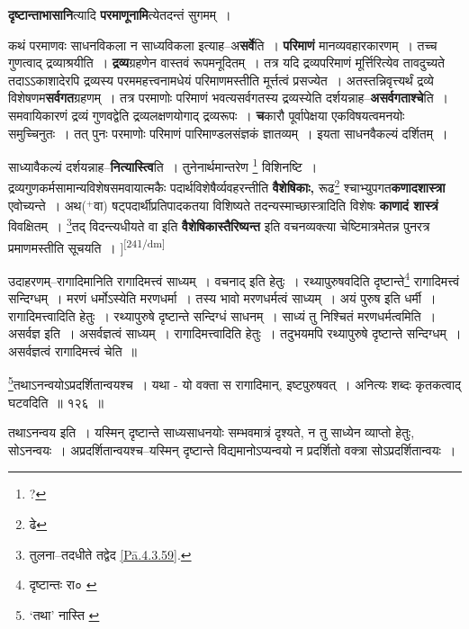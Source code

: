 \documentclass[article,12pt,a4paper]{memoir}
\newcommand{\add}[1]{($^{+}$#1)}
\begin{document}
	  \pstart \textbf{दृष्टान्ताभासानि}त्यादि \textbf{परमाणूनामि}त्येतदन्तं सुगमम् ।
	\pend
      

	  \pstart कथं परमाणवः साधनविकला न साध्यविकला इत्याह--अ\textbf{सर्वे}ति । \textbf{परिमाणं} मानव्यवहारकारणम् । तच्च गुणत्वाद् द्रव्याश्रयीति । \textbf{द्रव्य}ग्रहणेन वास्तवं रूपमनूदितम् । तत्र यदि द्रव्यपरिमाणं मूर्त्तिरित्येव तावदुच्यते तदाऽऽकाशादेरपि द्रव्यस्य परममहत्त्वनामधेयं परिमाणमस्तीति मूर्त्तत्वं प्रसज्येत । अतस्तन्निवृत्त्यर्थं द्रव्ये विशेषणम\textbf{सर्वगत}ग्रहणम् । तत्र परमाणोः परिमाणं भवत्यसर्वगतस्य द्रव्यस्येति दर्शयन्नाह--\textbf{असर्वगताश्चे}ति । समवायिकारणं द्रव्यं गुणवद्वेति द्रव्यलक्षणयोगाद् द्रव्यरूपः । \textbf{च}कारौ पूर्वापेक्षया एकविषयत्वमनयोः समुच्चिनुतः । तत् पुनः परमाणोः परिमाणं पारिमाण्डलसंज्ञकं ज्ञातव्यम् । इयता साधनवैकल्यं दर्शितम् ।
	\pend
      

	  \pstart साध्यावैकल्यं दर्शयन्नाह--\textbf{नित्यास्त्वि}ति । तुनेनार्थमान्तरेण \footnote{?} विशिनष्टि । द्रव्यगुणकर्मसामान्यविशेषसमवायात्मकैः पदार्थविशेषैर्व्यवहरन्तीति \textbf{वैशेषिकाः,} रूढ\footnote{ढे} श्चाभ्युपगत\textbf{कणादशास्त्रा} एवोच्यन्ते । अथ\add{वा} षट्पदार्थीप्रतिपादकतया विशिष्यते तदन्यस्माच्छास्त्रादिति विशेषः \textbf{काणादं शास्त्रं} विवक्षितम् । \footnote{तुलना--तदधीते तद्वेद \cref{Pā.4.3.59}.}तद् विदन्त्यधीयते वा इति \textbf{वैशेषिकास्तैरिष्यन्त} इति वचनव्यक्त्या चेष्टिमात्रमेतन्न पुनरत्र प्रमाणमस्तीति सूचयति ।
	\pend
      [[दिति साध्य० \cite{dp-msB} \cite{dp-edP} \cite{dp-edH} \cite{dp-edE} \cite{dp-edN}]]\leavevmode\textsuperscript{\rmlatinfont\tiny [241/dm]}

	  \pstart उदाहरणम्--रागादिमानिति रागादिमत्त्वं साध्यम् । वचनाद् इति हेतुः । रथ्यापुरुषवदिति दृष्टान्ते\footnote{दृष्टान्तः रा० \cite{dp-msA} \cite{dp-msB} \cite{dp-msD} \cite{dp-edP} \cite{dp-edH} \cite{dp-edE} \cite{dp-edN}} रागादिमत्त्वं सन्दिग्धम् । मरणं धर्मोऽस्येति मरणधर्मा । तस्य भावो मरणधर्मत्वं साध्यम् । अयं पुरुष इति धर्मी । रागादिमत्त्वादिति हेतुः । रथ्यापुरुषे दृष्टान्ते सन्दिग्धं साधनम् । साध्यं तु निश्चितं मरणधर्मत्वमिति । असर्वज्ञ इति । असर्वज्ञत्वं साध्यम् । रागादिमत्त्वादिति हेतुः । तदुभयमपि रथ्यापुरुषे दृष्टान्ते सन्दिग्धम् । असर्वज्ञत्वं रागादिमत्त्वं चेति ॥
	\pend
       

	  \pstart \footnote{‘तथा’ नास्ति \cite{dp-msB} \cite{dp-edP} \cite{dp-edH} \cite{dp-edE} \cite{dp-edN}}तथाऽनन्वयोऽप्रदर्शितान्वयश्च । यथा - यो वक्ता स रागादिमान्, इष्टपुरुषवत् । अनित्यः शब्दः कृतकत्वाद् घटवदिति ॥ १२६ ॥
	\pend
       

	  \pstart तथाऽनन्वय इति । यस्मिन् दृष्टान्ते साध्यसाधनयोः सम्भवमात्रं दृश्यते, न तु साध्येन व्याप्तो हेतुः, सोऽनन्वयः । अप्रदर्शितान्वयश्च--यस्मिन् दृष्टान्ते विद्यमानोऽप्यन्वयो न प्रदर्शितो वक्त्रा सोऽप्रदर्शितान्वयः ।
	\pend
       
\end{document}
